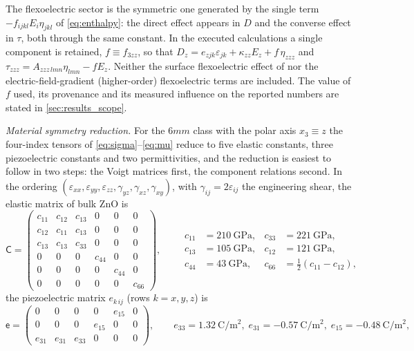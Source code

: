 The flexoelectric sector is the symmetric one generated by the single term
$-f_{ijkl}E_i\eta_{jkl}$ of \eqref{eq:enthalpy}: the direct effect appears in
$D$ and the converse effect in $\tau$, both through the same constant.  In the
executed calculations a single component is retained, $f\equiv f_{3zz}$, so
that $D_z=e_{zjk}\varepsilon_{jk}+\kappa_{zz}E_z+f\,\eta_{zzz}$ and
$\tau_{zzz}=A_{zzz\,lmn}\eta_{lmn}-f E_z$.  Neither the surface flexoelectric
effect of \cite{shen2010theory} nor the electric-field-gradient (higher-order)
flexoelectric terms are included.  The value of $f$ used, its provenance and
its measured influence on the reported numbers are stated in
\cref{sec:results_scope}.

\emph{Material symmetry reduction.}  For the $6mm$ class with the polar axis
$x_3\equiv z$ the four-index tensors of \eqref{eq:sigma}--\eqref{eq:mu} reduce
to five elastic constants, three piezoelectric constants and two permittivities,
and the reduction is easiest to follow in two steps: the Voigt matrices first,
the component relations second.  In the ordering
$(\varepsilon_{xx},\varepsilon_{yy},\varepsilon_{zz},\gamma_{yz},\gamma_{xz},
\gamma_{xy})$, with $\gamma_{ij}=2\varepsilon_{ij}$ the engineering shear, the
elastic matrix of bulk ZnO is
\begin{equation}
\label{eq:CZnO}
\mathsf C=
\begin{pmatrix}
c_{11}&c_{12}&c_{13}&0&0&0\\
c_{12}&c_{11}&c_{13}&0&0&0\\
c_{13}&c_{13}&c_{33}&0&0&0\\
0&0&0&c_{44}&0&0\\
0&0&0&0&c_{44}&0\\
0&0&0&0&0&c_{66}
\end{pmatrix},
\qquad
\begin{aligned}
c_{11}&=\SI{210}{\giga\pascal},& c_{33}&=\SI{221}{\giga\pascal},\\
c_{13}&=\SI{105}{\giga\pascal},& c_{12}&=\SI{121}{\giga\pascal},\\
c_{44}&=\SI{43}{\giga\pascal},& c_{66}&=\tfrac12(c_{11}-c_{12}),
\end{aligned}
\end{equation}
the piezoelectric matrix $e_{k\,ij}$ (rows $k=x,y,z$) is
\begin{equation}
\label{eq:ZnOe}
\mathsf e=
\begin{pmatrix}
0&0&0&0&e_{15}&0\\
0&0&0&e_{15}&0&0\\
e_{31}&e_{31}&e_{33}&0&0&0
\end{pmatrix},
\qquad
e_{33}=\SI{1.32}{\coulomb\per\square\metre},\;
e_{31}=\SI{-0.57}{\coulomb\per\square\metre},\;
e_{15}=\SI{-0.48}{\coulomb\per\square\metre},
\end{equation}

